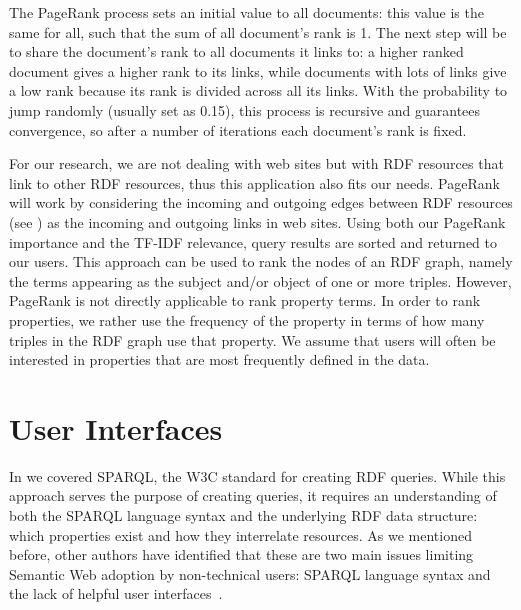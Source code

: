 The PageRank process sets an initial value to all documents: this value is the same for all, such that the sum of all document’s rank is 1. The next step will be to share the document's rank to all documents it links to: a higher ranked document gives a higher rank to its links, while documents with lots of links give a low rank because its rank is divided across all its links. With the probability to jump randomly (usually set as 0.15), this process is recursive and guarantees convergence, so after a number of iterations each document’s rank is fixed.

For our research, we are not dealing with web sites but with RDF resources that link to other RDF resources, thus this application also fits our needs. PageRank will work by considering the incoming and outgoing edges between RDF resources (see ) as the incoming and outgoing links in web sites. Using both our PageRank importance and the TF-IDF relevance, query results are sorted and returned to our users. This approach can be used to rank the nodes of an RDF graph, namely the terms appearing as the subject and/or object of one or more triples. However, PageRank is not directly applicable to rank property terms. In order to rank properties, we rather use the frequency of the property in terms of how many triples in the RDF graph use that property. We assume that users will often be interested in properties that are most frequently defined in the data.


\section{User Interfaces}

In  we covered SPARQL, the W3C standard for creating RDF queries. While this approach serves the purpose of creating queries, it requires an understanding of both the SPARQL language syntax and the underlying RDF data structure: which properties exist and how they interrelate resources. As we mentioned before, other authors have identified that these are two main issues limiting Semantic Web adoption by non-technical users: SPARQL language syntax and the lack of helpful user interfaces~\cite{Ferre2016, Lehmann2014, Unger2014}.

